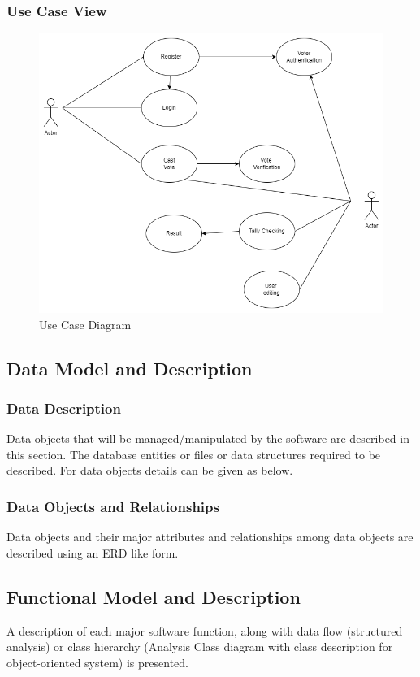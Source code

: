 \documentclass[oneside, 12pt]{book}
\begin{document}
			\subsubsection{Use Case View}
				\begin{figure}[H]
					\centering
					\includegraphics[width=\linewidth]{./Resources/use-case.png}
				    \caption{Use Case Diagram}
				    \label{fig:use-case}
				\end{figure}
		\subsection{Data Model and Description}
			\subsubsection{Data Description}
				Data objects that will be managed/manipulated by the software are described in this section. The database entities or files or data structures required to be described. For data objects details can be given as below.
			\subsubsection{Data Objects and Relationships}
				Data objects and their major attributes and relationships among data objects are described using an ERD like form.
		\subsection{Functional Model and Description}
			A description of each major software function, along with data flow (structured analysis) or class hierarchy (Analysis Class diagram with class description for object-oriented system) is presented.
\end{document}
